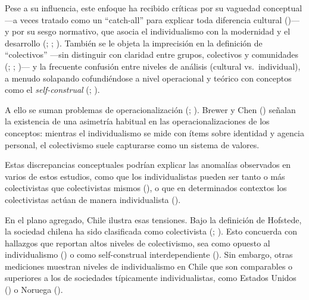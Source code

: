 \documentclass[
  letterpaper,
  DIV=11,
  numbers=noendperiod]{scrartcl}
\begin{document}
Pese a su influencia, este enfoque ha recibido críticas por su vaguedad
conceptual ---a veces tratado como un ``catch-all'' para explicar toda
diferencia cultural ()--- y por su sesgo normativo, que asocia el individualismo con la
modernidad y el desarrollo (; ;
). También se le objeta la
imprecisión en la definición de ``colectivos'' ---sin distinguir con
claridad entre grupos, colectivos y comunidades
(;
;
)--- y la
frecuente confusión entre niveles de análisis (cultural vs.~individual),
a menudo solapando cofundiéndose a nivel operacional y teórico con
conceptos como el \emph{self-construal} (; ).

A ello se suman problemas de operacionalización
(;
). Brewer
y Chen () señalan la existencia de una
asimetría habitual en las operacionalizaciones de los conceptos:
mientras el individualismo se mide con ítems sobre identidad y agencia
personal, el colectivismo suele capturarse como un sistema de valores.

Estas discrepancias conceptuales podrían explicar las anomalías
observados en varios de estos estudios, como que los individualistas
pueden ser tanto o más colectivistas que colectivistas mismos
(), o que
en determinados contextos los colectivistas actúan de manera
individualista ().

En el plano agregado, Chile ilustra esas tensiones. Bajo la definición
de Hofstede, la sociedad chilena ha sido clasificada como colectivista
(; ). Esto concuerda con hallazgos que reportan altos niveles de
colectivismo, sea como opuesto al individualismo
() o como
self-construal interdependiente (). Sin embargo, otras mediciones muestran niveles de
individualismo en Chile que son comparables o superiores a los de
sociedades típicamente individualistas, como Estados Unidos
() o
Noruega ().
\end{document}
